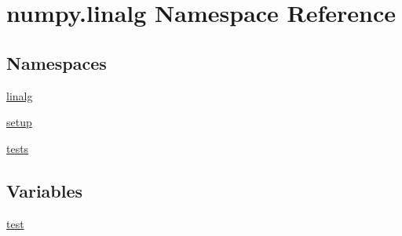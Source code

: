 \hypertarget{namespacenumpy_1_1linalg}{}\section{numpy.\+linalg Namespace Reference}
\label{namespacenumpy_1_1linalg}
\subsection*{Namespaces}
\begin{DoxyCompactItemize}
\item 
 \hyperlink{namespacenumpy_1_1linalg_1_1linalg}{linalg}
\item 
 \hyperlink{namespacenumpy_1_1linalg_1_1setup}{setup}
\item 
 \hyperlink{namespacenumpy_1_1linalg_1_1tests}{tests}
\end{DoxyCompactItemize}
\subsection*{Variables}
\begin{DoxyCompactItemize}
\item 
\hyperlink{namespacenumpy_1_1linalg_ad3c8c6b67058d83f35678d387a965770}{test}
\end{DoxyCompactItemize}


